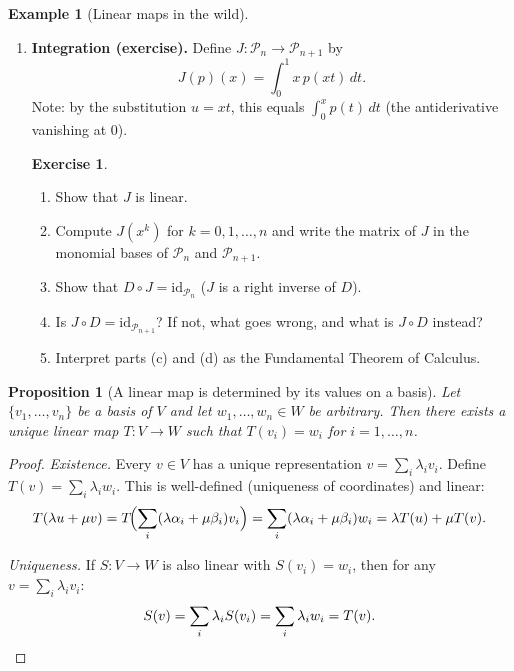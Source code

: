\documentclass[11pt]{article}
\theoremstyle{definition}
\newtheorem{example}{Example}[section]
\newtheorem{exercise}{Exercise}[section]
\theoremstyle{plain}
\newtheorem{proposition}{Proposition}[section]
\begin{document}
\begin{example}[Linear maps in the wild]
\begin{enumerate}
    \item \textbf{Integration (exercise).}  Define
      $J:\mathcal{P}_n\to\mathcal{P}_{n+1}$ by
      \[
        J(p)(x) = \int_0^1 x\,p(xt)\,dt.
      \]
      Note: by the substitution $u = xt$, this equals $\int_0^x p(t)\,dt$
      (the antiderivative vanishing at $0$).

      \begin{exercise}
        \leavevmode
        \begin{enumerate}[label=(\alph*)]
          \item Show that $J$ is linear.
          \item Compute $J(x^k)$ for $k=0,1,\ldots,n$ and write the matrix
                of $J$ in the monomial bases of $\mathcal{P}_n$ and
                $\mathcal{P}_{n+1}$.
          \item Show that $D\circ J = \mathrm{id}_{\mathcal{P}_n}$
                ($J$ is a right inverse of $D$).
          \item Is $J\circ D = \mathrm{id}_{\mathcal{P}_{n+1}}$?  If not,
                what goes wrong, and what is $J\circ D$ instead?
          \item Interpret parts (c) and (d) as the Fundamental Theorem
                of Calculus.
        \end{enumerate}
      \end{exercise}
  \end{enumerate}
\end{example}

\begin{proposition}[A linear map is determined by its values on a basis]
  \label{prop:linmap-basis}
  Let $\{v_1,\ldots,v_n\}$ be a basis of $V$ and let $w_1,\ldots,w_n\in W$
  be arbitrary.  Then there exists a \emph{unique} linear map $T:V\to W$
  such that $T(v_i)=w_i$ for $i=1,\ldots,n$.
\end{proposition}
\begin{proof}
  \textit{Existence.}  Every $v\in V$ has a unique representation
  $v=\sum_i\lambda_i v_i$.  Define $T(v)=\sum_i\lambda_i w_i$.  This is
  well-defined (uniqueness of coordinates) and linear:
  \[
    T(\lambda u+\mu v)
    = T\!\Bigl(\sum_i(\lambda\alpha_i+\mu\beta_i)v_i\Bigr)
    = \sum_i(\lambda\alpha_i+\mu\beta_i)w_i
    = \lambda T(u)+\mu T(v).
  \]

  \textit{Uniqueness.}  If $S:V\to W$ is also linear with $S(v_i)=w_i$,
  then for any $v=\sum_i\lambda_i v_i$:
  \[
    S(v) = \sum_i\lambda_i S(v_i) = \sum_i\lambda_i w_i = T(v). \qedhere
  \]
\end{proof}
\end{document}
